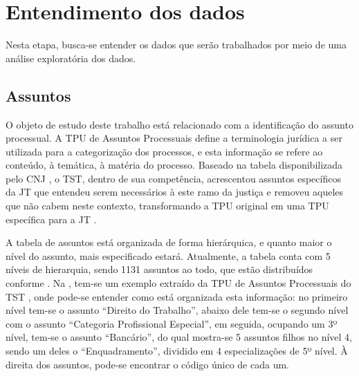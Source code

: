 
\section{Entendimento dos dados}%

Nesta etapa, busca-se entender os dados que serão trabalhados por meio de uma análise exploratória dos dados. 

\subsection{Assuntos}



O objeto de estudo deste trabalho está relacionado com a identificação do assunto processual. A TPU de Assuntos Processuais define a terminologia jurídica a ser utilizada para a categorização dos processos, e esta informação se refere ao conteúdo, à temática, à matéria do processo. Baseado na tabela disponibilizada pelo CNJ \cite{tpucnj}, o TST, dentro de sua competência, acrescentou assuntos específicos da JT que entendeu serem necessários à este ramo da justiça e removeu aqueles que não cabem neste contexto, transformando a TPU original em uma TPU específica para a JT \cite{tputst}.

A tabela de assuntos está organizada de forma hierárquica, e quanto maior o nível do assunto, mais especificado estará. Atualmente, a tabela conta com 5 níveis de hierarquia, sendo 1131 assuntos ao todo, que estão distribuídos conforme . Na , tem-se um exemplo extraído da TPU de Assuntos Processuais do TST \cite{tputst}, onde pode-se entender como está organizada esta informação: no primeiro nível tem-se o assunto ``Direito do Trabalho'', abaixo dele tem-se o segundo nível com o assunto ``Categoria Profissional Especial'', em seguida, ocupando um 3º nível, tem-se o assunto ``Bancário'', do qual mostra-se 5 assuntos filhos no nível 4, sendo um deles o ``Enquadramento'', dividido em 4 especializações de 5º nível. À direita dos assuntos, pode-se encontrar o código único de cada um.

%

